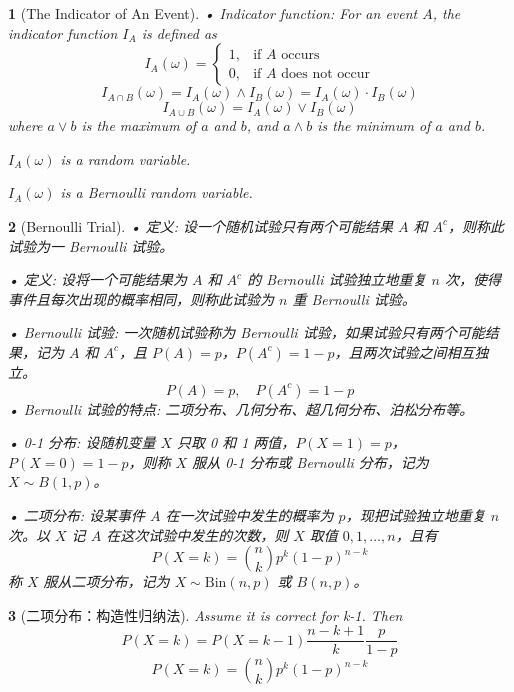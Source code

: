 \documentclass[UTF8]{report}
\theoremstyle{MyLineTheoremStyle} %
\theoremstyle{MyBlockTheoremStyle} %
\theoremstyle{MySubsubsectionStyle} %
\newtheorem{definition}{}
\begin{document}
\begin{definition}[The Indicator of An Event]
    • Indicator function: For an event \(A\), the indicator function \(I_A\) is defined as
    \[
    I_A(\omega) = 
    \begin{cases}
        1, & \text{if } A \text{ occurs} \\
        0, & \text{if } A \text{ does not occur}
    \end{cases}
    \]
    \[
    I_{A \cap B}(\omega) = I_A(\omega) \land I_B(\omega) = I_A(\omega) \cdot I_B(\omega)
    \]
    \[
    I_{A \cup B}(\omega) = I_A(\omega) \lor I_B(\omega)
    \]
    where \(a \lor b\) is the maximum of \(a\) and \(b\), and \(a \land b\) is the minimum of \(a\) and \(b\).\par
    \(I_A(\omega)\) is a random variable.\par
    \(I_A(\omega)\) is a Bernoulli random variable.
\end{definition}

\begin{definition}[Bernoulli Trial]
    • 定义: 设一个随机试验只有两个可能结果 \(A\) 和 \(A^c\)，则称此试验为一 Bernoulli 试验。\par
    • 定义: 设将一个可能结果为 \(A\) 和 \(A^c\) 的 Bernoulli 试验独立地重复 \(n\) 次，使得事件且每次出现的概率相同，则称此试验为 \(n\) 重 Bernoulli 试验。\par
    • Bernoulli 试验: 一次随机试验称为 Bernoulli 试验，如果试验只有两个可能结果，记为 \(A\) 和 \(A^c\)，且 \(P(A) = p\)，\(P(A^c) = 1 - p\)，且两次试验之间相互独立。
    \[
    P(A) = p, \quad P(A^c) = 1 - p
    \]
    • Bernoulli 试验的特点: 二项分布、几何分布、超几何分布、泊松分布等。\par
    • 0-1 分布: 设随机变量 \(X\) 只取 0 和 1 两值，\(P(X=1)=p\)，\(P(X=0)=1-p\)，则称 \(X\) 服从 0-1 分布或 Bernoulli 分布，记为 \(X \sim B(1, p)\)。\par
    • 二项分布: 设某事件 \(A\) 在一次试验中发生的概率为 \(p\)，现把试验独立地重复 \(n\) 次。以 \(X\) 记 \(A\) 在这次试验中发生的次数，则 \(X\) 取值 \(0, 1, \ldots, n\)，且有
    \[
    P(X = k) = \binom{n}{k} p^k (1 - p)^{n - k}
    \]
    称 \(X\) 服从二项分布，记为 \(X \sim \text{Bin}(n, p)\) 或 \(B(n, p)\)。
\end{definition}

\begin{definition}[二项分布：构造性归纳法]
    Assume it is correct for k-1. Then
    \[
    P(X = k) = P(X = k - 1) \frac{n - k + 1}{k} \frac{p}{1 - p}
    \]
    \[
    P(X = k) = \binom{n}{k} p^k (1 - p)^{n - k}
    \]

\end{definition}
\end{document}
